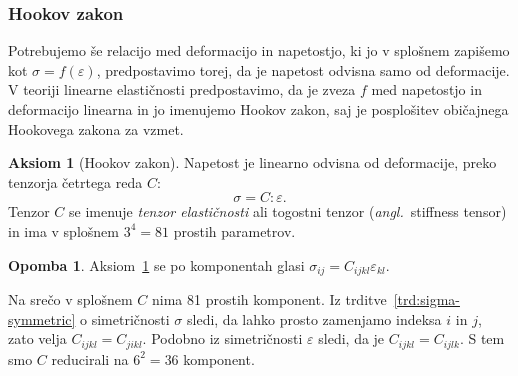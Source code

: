 \documentclass[12pt,a4paper,twoside]{article}
\theoremstyle{definition} %
\newtheorem{opomba}[definicija]{Opomba}
\newtheorem{aksiom}{Aksiom}
\theoremstyle{plain} %
\numberwithin{equation}{section}
\newcommand{\eps}{\varepsilon}
\newcommand{\ts}{\sigma}
\newcommand{\ang}[1]{(\hspace{-1.5px}\textit{angl.}\ #1)}
\begin{document}
\subsubsection{Hookov zakon}
Potrebujemo še relacijo med deformacijo in napetostjo, ki jo v splošnem zapišemo kot $\ts =
f(\eps)$, predpostavimo torej, da je napetost odvisna samo od deformacije. V teoriji linearne
elastičnosti predpostavimo, da je zveza $f$ med napetostjo in deformacijo linearna in jo imenujemo
Hookov zakon, saj je posplošitev običajnega Hookovega zakona za vzmet.
\begin{aksiom}[Hookov zakon]
  \label{aks:hook}
  Napetost je linearno odvisna od deformacije, preko tenzorja četrtega reda $C$:
  \begin{equation}
    \label{eq:hooke}
    \ts = C:\eps.
  \end{equation}
  Tenzor $C$ se imenuje \emph{tenzor elastičnosti} ali togostni tenzor
  \ang{stiffness tensor} in ima v splošnem $3^4 = 81$ prostih parametrov.
\end{aksiom}
\begin{opomba}
  Aksiom~\ref{aks:hook} se po komponentah glasi $\ts_{ij} = C_{ijkl}
  \eps_{kl}$.
\end{opomba}
Na srečo v splošnem $C$ nima 81 prostih komponent.
Iz trditve~\ref{trd:sigma-symmetric} o simetričnosti $\ts$ sledi, da lahko
prosto zamenjamo indeksa $i$ in $j$, zato velja $C_{ijkl} = C_{jikl}$.
Podobno iz simetričnosti $\eps$ sledi, da je $C_{ijkl} = C_{ijlk}$.
S tem smo $C$ reducirali na $6^2 = 36$ komponent.
\end{document}
